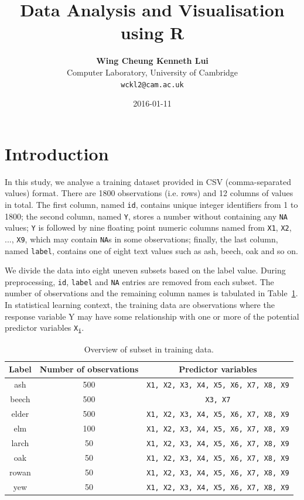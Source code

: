 \documentclass{article}
\title{Data Analysis and Visualisation using R}
\date{2016-01-11}
\author{\textbf{Wing Cheung Kenneth Lui} \\
Computer Laboratory, University of Cambridge \\
{\tt wckl2@cam.ac.uk}}
\begin{document}
  \maketitle

\section{Introduction}

In this study, we analyse a training dataset provided in CSV (comma-separated values) format. There are 1800 observations (i.e. rows) and 12 columns of values in total. The first column, named {\tt id}, contains unique integer identifiers from 1 to 1800; the second column, named {\tt Y}, stores a number without containing any {\tt NA} values; {\tt Y} is followed by nine floating point numeric columns named from {\tt X1}, {\tt X2},  \(...\), {\tt X9}, which may contain {\tt NA}s in some observations; finally, the last column, named {\tt label}, contains one of eight text values such as ash, beech, oak and so on.

We divide the data into eight uneven subsets based on the label value. During preprocessing, {\tt id}, {\tt label} and {\tt NA} entries are removed from each subset. The number of observations and the remaining column names is tabulated in Table~\ref{subset-table}. In statistical learning context, the training data are observations where the response variable Y may have some relationship with one or more of the potential predictor variables {\tt X\textsubscript{i}}.

\begin{table}
\begin{center}
\begin{tabular}{|c|c|c|}
\hline \bf Label & \bf Number of observations & \bf Predictor variables \\ \hline
ash & 500 & {\tt X1, X2, X3, X4, X5, X6, X7, X8, X9} \\ \hline
beech & 500 & {\tt X3, X7} \\ \hline
elder & 500 & {\tt X1, X2, X3, X4, X5, X6, X7, X8, X9} \\ \hline
elm & 100 & {\tt X1, X2, X3, X4, X5, X6, X7, X8, X9} \\ \hline
larch & 50 & {\tt X1, X2, X3, X4, X5, X6, X7, X8, X9} \\ \hline
oak & 50 & {\tt X1, X2, X3, X4, X5, X6, X7, X8, X9} \\ \hline
rowan & 50 & {\tt X1, X2, X3, X4, X5, X6, X7, X8, X9} \\ \hline
yew & 50 & {\tt X1, X2, X3, X4, X5, X6, X7, X8, X9} \\ \hline
\end{tabular}
\end{center}
\caption{\label{subset-table} Overview of subset in training data.}
\end{table}
\end{document}
